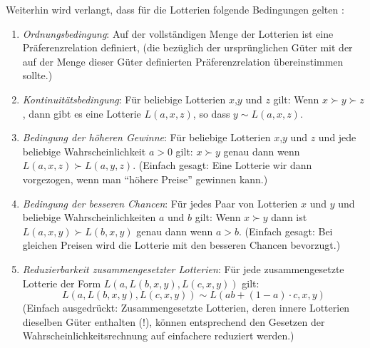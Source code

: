 Weiterhin wird verlangt, dass für die Lotterien folgende Bedingungen gelten
\cite[S. 90-92]{resnik:1987} \label{LotterienBedingungen}:
\begin{enumerate}
  \item {\em Ordnungsbedingung}: Auf der vollständigen Menge der Lotterien ist
  eine Präferenzrelation definiert, (die bezüglich der ursprünglichen Güter 
  mit der auf der Menge dieser Güter definierten Präferenzrelation
  übereinstimmen sollte.)
  \item {\em Kontinuitätsbedingung}:\label{Kontinuitaet}
  Für beliebige Lotterien $x$,$y$ und $z$
  gilt: Wenn $x \succ y \succ z$, dann gibt es eine Lotterie 
  $L(a, x, z)$, so dass $y \sim L(a, x, z)$.  
  \item {\em Bedingung der höheren Gewinne}:\label{BedHoehereGewinne}
  Für beliebige Lotterien $x$,$y$
  und $z$ und jede beliebige Wahrscheinlichkeit $a > 0$ gilt: $x \succ y$ genau
  dann wenn $L(a, x, z) \succ L(a, y, z)$.
  (Einfach gesagt: Eine Lotterie wir dann vorgezogen, wenn man "`höhere Preise"'
  gewinnen kann.)
  \item {\em Bedingung der besseren Chancen}: Für jedes Paar von Lotterien $x$
  und $y$ und beliebige Wahrscheinlichkeiten $a$ und $b$ gilt: 
  Wenn $x \succ y$ dann ist $L(a, x, y) \succ L(b, x, y)$ genau dann wenn $a > b$.
  (Einfach gesagt: Bei gleichen Preisen wird die Lotterie mit den besseren
  Chancen bevorzugt.)
  \item {\em Reduzierbarkeit zusammengesetzter Lotterien}:
  \label{Reduzierbarkeit} 
  Für jede zusammengesetzte Lotterie der Form $L(a, L(b,x,y), L(c,x,y))$ gilt:
  \[L(a, L(b,x,y), L(c,x,y)) \sim L(ab+(1-a)\cdot c, x, y) \] 
  (Einfach ausgedrückt: Zusammengesetzte Lotterien, deren innere Lotterien
  dieselben Güter enthalten (!), können ent\-sprech\-end den Gesetzen der
  Wahrscheinlichkeitsrechnung auf einfachere reduziert werden.)
\end{enumerate}

